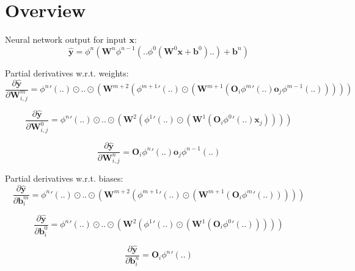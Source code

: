 \documentclass{article}
\begin{document}
\section{Overview}

Neural network output for input $\textbf{x}$:
$$\hat{\textbf{y}}=\phi^n(\textbf{W}^n\phi^{n-1}(..\phi^{0}(\textbf{W}^0\textbf{x}+\textbf{b}^0)..)+\textbf{b}^n)$$

\noindent 
Partial derivatives w.r.t. weights:
$$\frac{\partial \hat{\textbf{y}}}{\partial \textbf{W}^m_{i,j}}={\phi^n}'(..)\odot..\odot(\textbf{W}^{m+2}({\phi^{m+1}}'(..)\odot(\textbf{W}^{m+1}(\textbf{O}_i{\phi^{m}}'(..)\textbf{o}_j\phi^{m-1}(..)))))$$

$$\frac{\partial \hat{\textbf{y}}}{\partial \textbf{W}^0_{i,j}}={\phi^n}'(..)\odot..\odot(\textbf{W}^{2}({\phi^{1}}'(..)\odot(\textbf{W}^{1}(\textbf{O}_i{\phi^{0}}'(..)\textbf{x}_j))))$$

$$\frac{\partial \hat{\textbf{y}}}{\partial \textbf{W}^n_{i,j}}=\textbf{O}_i{\phi^{n}}'(..)\textbf{o}_j\phi^{n-1}(..)$$

\noindent 
Partial derivatives w.r.t. biases:
$$\frac{\partial \hat{\textbf{y}}}{\partial \textbf{b}^m_{i}}={\phi^n}'(..)\odot..\odot(\textbf{W}^{m+2}({\phi^{m+1}}'(..)\odot(\textbf{W}^{m+1}(\textbf{O}_i{\phi^{m}}'(..)))))$$

$$\frac{\partial \hat{\textbf{y}}}{\partial \textbf{b}^0_{i}}={\phi^n}'(..)\odot..\odot(\textbf{W}^{2}({\phi^{1}}'(..)\odot(\textbf{W}^{1}(\textbf{O}_i{\phi^{0}}'(..)))))$$

$$\frac{\partial \hat{\textbf{y}}}{\partial \textbf{b}^n_{i}}=\textbf{O}_i{\phi^{n}}'(..)$$
\end{document}
